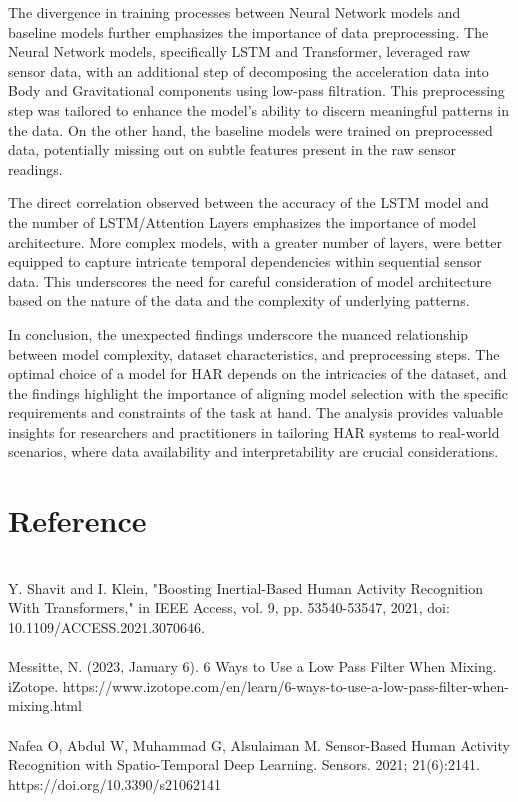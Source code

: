 \documentclass[11pt]{article}
\begin{document}
The divergence in training processes between Neural Network models and baseline models further emphasizes the importance of data preprocessing. The Neural Network models, specifically LSTM and Transformer, leveraged raw sensor data, with an additional step of decomposing the acceleration data into Body and Gravitational components using low-pass filtration. This preprocessing step was tailored to enhance the model's ability to discern meaningful patterns in the data. On the other hand, the baseline models were trained on preprocessed data, potentially missing out on subtle features present in the raw sensor readings.

The direct correlation observed between the accuracy of the LSTM model and the number of LSTM/Attention Layers emphasizes the importance of model architecture. More complex models, with a greater number of layers, were better equipped to capture intricate temporal dependencies within sequential sensor data. This underscores the need for careful consideration of model architecture based on the nature of the data and the complexity of underlying patterns.

In conclusion, the unexpected findings underscore the nuanced relationship between model complexity, dataset characteristics, and preprocessing steps. The optimal choice of a model for HAR depends on the intricacies of the dataset, and the findings highlight the importance of aligning model selection with the specific requirements and constraints of the task at hand. The analysis provides valuable insights for researchers and practitioners in tailoring HAR systems to real-world scenarios, where data availability and interpretability are crucial considerations.


\section{Reference}\\
Y. Shavit and I. Klein, "Boosting Inertial-Based Human Activity Recognition With Transformers," in IEEE Access, vol. 9, pp. 53540-53547, 2021, doi: 10.1109/ACCESS.2021.3070646.\\\\Messitte, N. (2023, January 6). 6 Ways to Use a Low Pass Filter When Mixing. iZotope. https://www.izotope.com/en/learn/6-ways-to-use-a-low-pass-filter-when-mixing.html\\\\Nafea O, Abdul W, Muhammad G, Alsulaiman M. Sensor-Based Human Activity Recognition with Spatio-Temporal Deep Learning. Sensors. 2021; 21(6):2141. https://doi.org/10.3390/s21062141 
\end{document}
